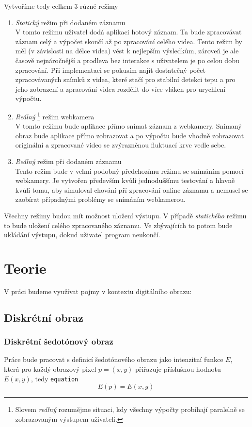 \documentclass[
  digital, %
  table,   %
%
  lof,     %
  lot,     %
]{fithesis3}
\begin{document}
Vytvoříme tedy celkem 3 různé režimy
\begin{enumerate}
	\item \emph{Statický} režim při dodaném záznamu \\
    V tomto režimu uživatel dodá aplikaci hotový záznam. Ta bude zpracovávat záznam celý a výpočet skončí až po zpracování celého videa. Tento režim by měl (v závislosti na délce videa) vést k nejlepším výsledkům, zároveň je ale časově nejnáročnější a prodleva bez interakce s uživatelem je po celou dobu zpracování. Při implementaci se pokusím najít dostatečný počet zpracovávaných snímků z videa, které stačí pro stabilní detekci tepu a pro jeho zobrazení a zpracování videa rozdělit do více vláken pro urychlení výpočtu.
    \item \emph{Reálný} \footnote{Slovem \emph{reálný} rozumějme situaci, kdy všechny výpočty probíhají paralelně se zobrazovaným výstupem uživateli. } režim webkamera \\
    V tomto režimu bude aplikace přímo snímat záznam z webkamery. Snímaný obraz bude aplikace přímo zobrazovat a po výpočtu bude vhodně zobrazovat originální a zpracované video se zvýrazněnou fluktuací krve vedle sebe.
	\item \emph{Reálný} režim při dodaném záznamu \\
    Tento režim bude v velmi podobný předchozímu režimu se snímáním pomocí webkamery. Je vytvořen především kvůli jednoduššímu testování a hlavně kvůli tomu, aby simuloval chování pří zpracování online záznamu a nemusel se zaobírat případnými problémy se snímáním webkamerou.
\end{enumerate}

Všechny režimy budou mít možnost uložení výstupu. V případě \emph{statického} režimu to bude uložení celého zpracovaného záznamu. Ve zbývajících to potom bude ukládání výstupu, dokud uživatel program neukončí.

\chapter{Teorie}
V práci budeme využívat pojmy v kontextu digitálního obrazu:
\section{Diskrétní obraz}
\subsection{Diskrétní šedotónový obraz}
Práce bude pracovat s definicí šedotónového obrazu jako intenzitní funkce $E$, která pro každý obrazový pixel $p = (x,y)$ přiřazuje příslušnou hodnotu $E(x,y)$, tedy
\texttt{equation}
\begin{equation}
	E(p) = E(x,y)
\end{equation}
\end{document}
